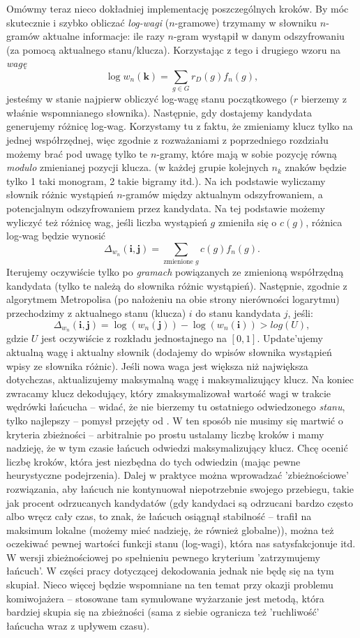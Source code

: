 \documentclass[a4paper]{article}
\theoremstyle{defn}
\theoremstyle{theorem}
\theoremstyle{lemma}
\theoremstyle{cor}
\theoremstyle{fact}
\begin{document}
Omówmy teraz nieco dokładniej implementację poszczególnych kroków. By móc skutecznie i szybko obliczać \textit{log-wagi} ($n$-gramowe) trzymamy w słowniku $n$-gramów aktualne informacje: ile razy $n$-gram wystąpił w danym odszyfrowaniu (za pomocą aktualnego stanu/klucza). Korzystając z tego i drugiego wzoru na \textit{wagę}
$$\log w_n(\boldsymbol{k}) =\sum\limits_{g \in G}  {r_D(g)} f_n(g),$$ 
jesteśmy w stanie najpierw obliczyć log-wagę stanu początkowego ($r$ bierzemy z właśnie wspomnianego słownika). Następnie, gdy dostajemy kandydata generujemy różnicę log-wag. Korzystamy tu z faktu, że zmieniamy klucz tylko na jednej współrzędnej, więc zgodnie z rozważaniami z poprzedniego rozdziału możemy brać pod uwagę tylko te $n$-gramy, które mają w sobie pozycję równą \textit{modulo} zmienianej pozycji klucza. (w każdej grupie kolejnych $n_k$ znaków będzie tylko 1 taki monogram, 2 takie bigramy itd.). Na ich podstawie wyliczamy słownik różnic wystąpień $n$-gramów między aktualnym odszyfrowaniem, a potencjalnym odszyfrowaniem przez kandydata. Na tej podstawie możemy wyliczyć też różnicę wag, jeśli liczba wystąpień $g$ zmieniła się o $c(g)$, różnica log-wag będzie wynosić 
$$\Delta_{w_n}(\boldsymbol{i},\boldsymbol{j}) = \sum\limits_{\text{zmienione } g}  {c(g)} f_n(g).$$ 
Iterujemy oczywiście tylko po \textit{gramach} powiązanych ze zmienioną współrzędną kandydata (tylko te należą do słownika różnic wystąpień). Następnie, zgodnie z algorytmem Metropolisa (po nałożeniu na obie strony nierówności logarytmu) przechodzimy z aktualnego stanu (klucza) $i$ do stanu kandydata $j$, jeśli:
$$\Delta_{w_n}(\boldsymbol{i},\boldsymbol{j}) =\log(w_n(\boldsymbol{j})) - \log(w_n(\boldsymbol{i})) > log(U),$$ gdzie $U$ jest oczywiście z rozkładu jednostajnego na $[0,1]$. Update'ujemy aktualną wagę i aktualny słownik (dodajemy do wpisów słownika wystąpień wpisy ze słownika różnic). Jeśli nowa waga jest większa niż największa dotychczas, aktualizujemy maksymalną wagę i maksymalizujący klucz. Na koniec zwracamy klucz dekodujący, który zmaksymalizował wartość wagi w trakcie wędrówki łańcucha – widać, że nie bierzemy tu ostatniego odwiedzonego \textit{stanu}, tylko najlepszy – pomysł przejęty od \cite{Chen&Rosenthal}. W ten sposób nie musimy się martwić o kryteria zbieżności – arbitralnie po prostu ustalamy liczbę kroków i mamy nadzieję, że w tym czasie łańcuch odwiedzi maksymalizujący klucz. Chcę ocenić liczbę kroków, która jest niezbędna do tych odwiedzin (mając pewne heurystyczne podejrzenia). Dalej w praktyce można wprowadzać 'zbieżnościowe' rozwiązania, aby łańcuch nie kontynuował niepotrzebnie swojego przebiegu, takie jak procent odrzucanych kandydatów (gdy kandydaci są odrzucani bardzo często albo wręcz cały czas, to znak, że łańcuch osiągnął stabilność – trafił na maksimum lokalne (możemy mieć nadzieję, że również globalne)), można też oczekiwać pewnej wartości funkcji stanu (log-wagi), która nas satysfakcjonuje itd. W wersji zbieżnościowej po spełnieniu pewnego kryterium 'zatrzymujemy łańcuch'. W części pracy dotyczącej dekodowania jednak nie będę się na tym skupiał. Nieco więcej będzie wspomniane na ten temat przy okazji problemu komiwojażera – stosowane tam symulowane wyżarzanie jest metodą, która bardziej skupia się na zbieżności (sama z siebie ogranicza też 'ruchliwość' łańcucha wraz z upływem czasu).
\end{document}
